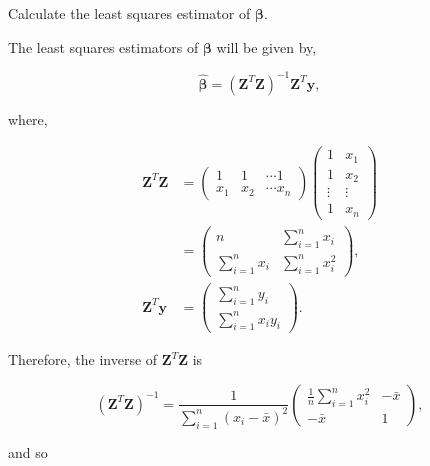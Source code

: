 \documentclass[
]{book}
\begin{document}
Calculate the least squares estimator of \(\mathbf{\beta}\).

The least squares estimators of \(\mathbf{\beta}\) will be given by,

\[ \mathbf{\hat{\beta}} = (\mathbf{Z}^T\mathbf{Z})^{-1}\mathbf{Z}^T\mathbf{y},\]

where,

\begin{align*}
\mathbf{Z}^T\mathbf{Z} &= \begin{pmatrix} 1 & 1 & \cdots 1 \\ x_1 & x_2 & \cdots x_n \end{pmatrix} \begin{pmatrix} 1 & x_1 \\ 1 & x_2 \\ \vdots & \vdots \\ 1 & x_n \end{pmatrix} \\[5pt]
&=\begin{pmatrix} n & \sum\limits_{i=1}^n x_i \\ \sum\limits_{i=1}^n x_i & \sum\limits_{i=1}^n x_i^2 \end{pmatrix}, \\[5pt]
\mathbf{Z}^T \mathbf{y} &= \begin{pmatrix} \sum\limits_{i=1}^n y_i \\ \sum\limits_{i=1}^n x_iy_i \end{pmatrix}.
\end{align*}

Therefore, the inverse of \(\mathbf{Z}^T\mathbf{Z}\) is

\[ \left( \mathbf{Z}^T\mathbf{Z} \right) ^{-1} = \frac{1}{\sum\limits_{i=1}^n (x_i-\bar{x})^2} \begin{pmatrix} \frac{1}{n} \sum\limits_{i=1}^{n} x_i^2 & -\bar{x} \\ -\bar{x} & 1 \end{pmatrix},\]

and so
\end{document}
